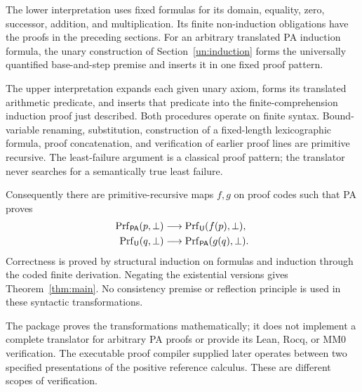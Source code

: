 The lower interpretation uses fixed formulas for its domain, equality, zero, successor, addition, and multiplication. Its finite non-induction obligations have the proofs in the preceding sections. For an arbitrary translated PA induction formula, the unary construction of Section~\ref{un:induction} forms the universally quantified base-and-step premise and inserts it in one fixed proof pattern.

The upper interpretation expands each given unary axiom, forms its translated arithmetic predicate, and inserts that predicate into the finite-comprehension induction proof just described. Both procedures operate on finite syntax. Bound-variable renaming, substitution, construction of a fixed-length lexicographic formula, proof concatenation, and verification of earlier proof lines are primitive recursive. The least-failure argument is a classical proof pattern; the translator never searches for a semantically true least failure.

Consequently there are primitive-recursive maps $f,g$ on proof codes such that PA proves
\begin{align*}
 \operatorname{Prf}_{\mathsf{PA}}(p,\bot)&\longrightarrow\operatorname{Prf}_{\mathsf{U}}(f(p),\bot),\\
 \operatorname{Prf}_{\mathsf{U}}(q,\bot)&\longrightarrow\operatorname{Prf}_{\mathsf{PA}}(g(q),\bot).
\end{align*}
Correctness is proved by structural induction on formulas and induction through the coded finite derivation. Negating the existential versions gives Theorem~\ref{thm:main}. No consistency premise or reflection principle is used in these syntactic transformations.

The package proves the transformations mathematically; it does not implement a complete translator for arbitrary PA proofs or provide its Lean, Rocq, or MM0 verification. The executable proof compiler supplied later operates between two specified presentations of the positive reference calculus. These are different scopes of verification.
